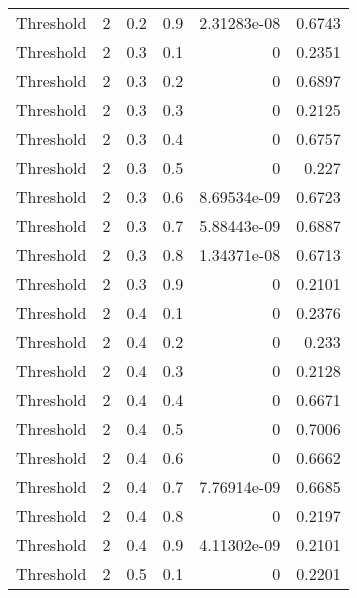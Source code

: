 \documentclass{article}
\begin{document}
\begin{longtable}[H]{lrrrrr}
 Threshold      &       2 &   0.2 &            0.9 &      2.31283e-08 &          0.6743 \\
 Threshold      &       2 &   0.3 &            0.1 &      0           &          0.2351 \\
 Threshold      &       2 &   0.3 &            0.2 &      0           &          0.6897 \\
 Threshold      &       2 &   0.3 &            0.3 &      0           &          0.2125 \\
 Threshold      &       2 &   0.3 &            0.4 &      0           &          0.6757 \\
 Threshold      &       2 &   0.3 &            0.5 &      0           &          0.227  \\
 Threshold      &       2 &   0.3 &            0.6 &      8.69534e-09 &          0.6723 \\
 Threshold      &       2 &   0.3 &            0.7 &      5.88443e-09 &          0.6887 \\
 Threshold      &       2 &   0.3 &            0.8 &      1.34371e-08 &          0.6713 \\
 Threshold      &       2 &   0.3 &            0.9 &      0           &          0.2101 \\
 Threshold      &       2 &   0.4 &            0.1 &      0           &          0.2376 \\
 Threshold      &       2 &   0.4 &            0.2 &      0           &          0.233  \\
 Threshold      &       2 &   0.4 &            0.3 &      0           &          0.2128 \\
 Threshold      &       2 &   0.4 &            0.4 &      0           &          0.6671 \\
 Threshold      &       2 &   0.4 &            0.5 &      0           &          0.7006 \\
 Threshold      &       2 &   0.4 &            0.6 &      0           &          0.6662 \\
 Threshold      &       2 &   0.4 &            0.7 &      7.76914e-09 &          0.6685 \\
 Threshold      &       2 &   0.4 &            0.8 &      0           &          0.2197 \\
 Threshold      &       2 &   0.4 &            0.9 &      4.11302e-09 &          0.2101 \\
 Threshold      &       2 &   0.5 &            0.1 &      0           &          0.2201 \\

\end{longtable}
\end{document}
